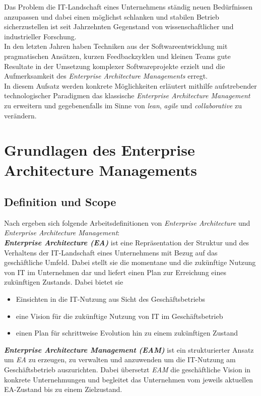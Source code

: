 \documentclass{llncs}
\begin{document}
Das Problem die IT-Landschaft eines Unternehmens ständig neuen Bedürfnissen anzupassen und dabei einen möglichst
schlanken und stabilen Betrieb sicherzustellen ist seit Jahrzehnten Gegenstand von wissenschaftlicher und industrieller Forschung.\\

In den letzten Jahren haben Techniken aus der Softwareentwicklung mit pragmatischen Ansätzen, kurzen Feedbackzyklen und kleinen Teams gute Resultate in der Umsetzung komplexer Softwareprojekte erzielt und die Aufmerksamkeit des \textit{Enterprise Architecture Managements} erregt\cite{buc:mat}.\\

In diesem Aufsatz werden konkrete Möglichkeiten erläutert mithilfe aufstrebender technologischer Paradigmen das klassische \textit{Enterprise Architecture Management} zu erweitern und gegebenenfalls im Sinne von \textit{lean}, \textit{agile} und \textit{collaborative} zu verändern.

%
\section{Grundlagen des Enterprise Architecture Managements}
\subsection{Definition und Scope}
Nach \cite{ben} ergeben sich folgende Arbeitsdefinitionen von \textit{Enterprise Architecture} und \textit{Enterprise Architecture Management}:\\

\textbf{\textit{Enterprise Architecture (EA)}} ist eine Repräsentation der Struktur und des Verhaltens der IT-Landschaft eines Unternehmens mit Bezug auf das geschäftliche Umfeld. Dabei stellt sie die momentane und die zukünftige Nutzung von IT im Unternehmen dar und liefert einen Plan zur Erreichung eines zukünftigen Zustands. Dabei bietet sie
%
\begin{itemize}
	\item Einsichten in die IT-Nutzung aus Sicht des Geschäftsbetriebs
	\item eine Vision für die zukünftige Nutzung von IT im Geschäftsbetrieb
	\item einen Plan für schrittweise Evolution hin zu einem zukünftigen Zustand
\end{itemize}

%
\textbf{\textit{Enterprise Architecture Management (EAM)}} ist ein strukturierter Ansatz um \textit{EA} zu erzeugen, zu verwalten und anzuwenden um die IT-Nutzung am Geschäftsbetrieb auszurichten. Dabei übersetzt \textit{EAM} die geschäftliche Vision in konkrete Unternehmungen und begleitet das Unternehmen vom jeweils aktuellen EA-Zustand bis zu einem Zielzustand.
 
\end{document}

